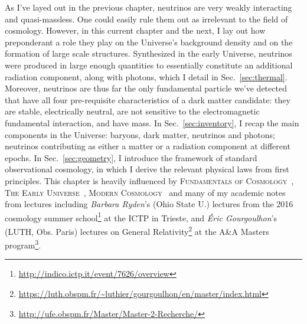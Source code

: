 \begin{intro}
{\color{purple}A}s I've layed out in the previous chapter, neutrinos are very weakly interacting and quasi-massless. One could easily rule them out as irrelevant to the field of cosmology. However, in this current chapter and the next, I lay out how preponderant a role they play on the Universe's background density and on the formation of large scale structures. Synthesized in the early Universe, neutrinos were produced in large enough quantities to essentially constitute an additional radiation component, along with photons, which I detail in Sec.~\ref{sec:thermal}. Moreover, neutrinos are thus far the only fundamental particle we've detected that have all four pre-requisite characteristics of a dark matter candidate: they are stable, electrically neutral, are not sensitive to the electromagnetic fundamental interaction, and have mass. In Sec.~\ref{sec:inventory}, I recap the main components in the Universe: baryons, dark matter, neutrinos and photons; neutrinos contributing as either a matter or a radiation component at different epochs. In Sec.~\ref{sec:geometry}, I introduce the framework of standard observational cosmology, in which I derive the relevant physical laws from first principles. This chapter is heavily influenced by \textsc{Fundamentals of Cosmology}~\citep{JamesRichBook}, \textsc{The Early Universe}~\citep{KolbTurnerBook}, \textsc{Modern Cosmology}~\citep{DodelsonBook} and many of my academic notes from lectures including \textit{Barbara Ryden}'s (Ohio State U.) lectures from the 2016 cosmology summer school\footnote{\url{http://indico.ictp.it/event/7626/overview}} at the ICTP in Trieste, and \textit{\'Eric Gourgoulhon}'s (LUTH, Obs. Paris) lectures on General Relativity\footnote{\url{https://luth.obspm.fr/~luthier/gourgoulhon/en/master/index.html}} at the A{\&}A Masters program\footnote{\url{http://ufe.obspm.fr/Master/Master-2-Recherche/}}. 
\end{intro}
\vspace{1.5pc}